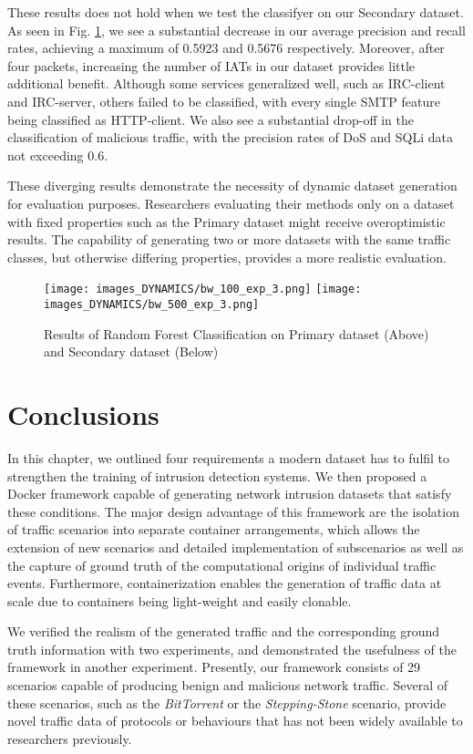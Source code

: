 These results does not hold when we test the classifyer on our Secondary dataset. As seen in Fig. \ref{figD:Primary}, we see a substantial decrease in our average precision and recall rates, achieving a maximum of 0.5923 and 0.5676 respectively. Moreover, after four packets, increasing the number of IATs in our dataset provides little additional benefit. Although some services generalized well, such as IRC-client and IRC-server, others failed to be classified, with every single SMTP feature being classified as HTTP-client. We also see a substantial drop-off in the classification of malicious traffic, with the precision rates of DoS and SQLi data not exceeding 0.6.

These diverging results demonstrate the necessity of dynamic dataset generation for evaluation purposes. Researchers evaluating their methods only on a dataset with fixed properties such as the Primary dataset might receive overoptimistic results. The capability of generating two or more datasets with the same traffic classes, but otherwise differing properties, provides a more realistic evaluation.


\begin{figure}[ht!]
\centering
 \texttt{[image: images\_DYNAMICS/bw\_100\_exp\_3.png]}
 \texttt{[image: images\_DYNAMICS/bw\_500\_exp\_3.png]}
\caption{Results of Random Forest Classification on Primary dataset (Above) and Secondary dataset (Below)}
\label{figD:Primary}
\end{figure}


\section{Conclusions}\label{SecD:Conclusion}

In this chapter, we outlined four requirements a modern dataset has to fulfil to strengthen the training of intrusion detection systems. We then proposed a Docker framework capable of generating network intrusion datasets that satisfy these conditions. The major design advantage of this framework are the isolation of traffic scenarios into separate container arrangements, which allows the extension of new scenarios and detailed implementation of subscenarios as well as the capture of ground truth of the computational origins of individual traffic events. Furthermore, containerization enables the generation of traffic data at scale due to containers being light-weight and easily clonable.

We verified the realism of the generated traffic and the corresponding ground truth information with two experiments, and demonstrated the usefulness of the framework in another experiment.
Presently, our framework consists of 29 scenarios capable of producing benign and malicious network traffic. Several of these scenarios, such as the \emph{BitTorrent} or the \emph{Stepping-Stone} scenario, provide novel traffic data of protocols or behaviours that has not been widely available to researchers previously.


